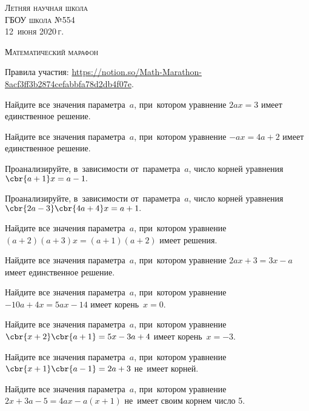 
\narrow


\begin{flushright}
\textsc{Летняя научная школа \\ ГБОУ школа №554 \\ 12~июня 2020\,г.}
\end{flushright}

\begin{center}
\LARGE \textsc{Математический марафон}
\end{center}

Правила участия: \href{https://www.notion.so/Math-Marathon-8acf3ff3b2874cefabbfa78d2db4f07e}{https://notion.so/Math-Marathon-8acf3ff3b2874cefabbfa78d2db4f07e}.

 Найдите все значения параметра~$a$, при~котором уравнение 
$2ax=3$ имеет единственное решение.

 Найдите все значения параметра~$a$, при~котором уравнение 
$-ax=4a+2$ имеет единственное решение.

 Проанализируйте, в~зависимости от~параметра~$a$, 
число корней уравнения~$\cbr{a+1}x=a-1.$

 Проанализируйте, в~зависимости от~параметра~$a$, 
число корней уравнения~$\cbr{2a-3}\cbr{4a+4}x=a+1.$

 Найдите все значения параметра~$a$, при~котором уравнение
$(a+2)(a+3)x=(a+1)(a+2)$ имеет решения.

 Найдите все значения параметра~$a$, при~котором уравнение
$2ax+3=3x-a$ имеет единственное решение.

 Найдите все значения параметра~$a$, при~котором уравнение
$-10a+4x=5ax-14$ имеет корень~$x=0$.

 Найдите все значения параметра~$a$, при~котором уравнение
$\cbr{x+2}\cbr{a+1}=5x-3a+4$ имеет корень~$x=-3.$

 Найдите все значения параметра~$a$, при~котором уравнение
$\cbr{x+1}\cbr{a-1}=2a+3$ не~имеет корней.

 Найдите все значения параметра~$a$, при~котором уравнение
$2x+3a-5=4ax-a(x+1)$ не~имеет своим корнем число 5.

